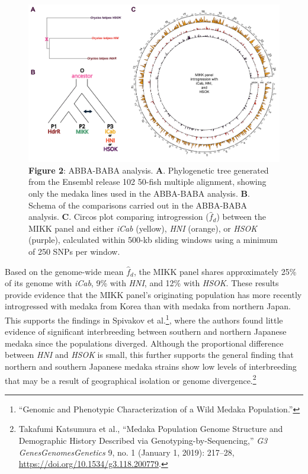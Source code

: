\documentclass[
]{book}
\begin{document}
\begin{figure}
\includegraphics[width=1\linewidth]{figs/mikk_genome/07_introgression} \caption{\textbf{Figure 2}: ABBA-BABA analysis. \textbf{A}. Phylogenetic tree generated from the Ensembl release 102 50-fish multiple alignment, showing only the medaka lines used in the ABBA-BABA analysis. \textbf{B}. Schema of the comparisons carried out in the ABBA-BABA analysis. \textbf{C}. Circos plot comparing introgression (\(\hat{f}_d\)) between the MIKK panel and either \emph{iCab} (yellow), \emph{HNI} (orange), or \emph{HSOK} (purple), calculated within 500-kb sliding windows using a minimum of 250 SNPs per window.}\label{fig:ABBABABA}
\end{figure}

Based on the genome-wide mean \(\hat{f}_d\), the MIKK panel shares approximately 25\% of its genome with \emph{iCab}, 9\% with \emph{HNI}, and 12\% with \emph{HSOK}. These results provide evidence that the MIKK panel's originating population has more recently introgressed with medaka from Korea than with medaka from northern Japan. This supports the findings in Spivakov et al.\footnote{{``Genomic and {Phenotypic Characterization} of a {Wild Medaka Population}.''}}, where the authors found little evidence of significant interbreeding between southern and northern Japanese medaka since the populations diverged. Although the proportional difference between \emph{HNI} and \emph{HSOK} is small, this further supports the general finding that northern and southern Japanese medaka strains show low levels of interbreeding that may be a result of geographical isolation or genome divergence.\footnote{Takafumi Katsumura et al., {``Medaka {Population Genome Structure} and {Demographic History Described} via {Genotyping-by-Sequencing},''} \emph{G3 Genes\textbar Genomes\textbar Genetics} 9, no. 1 (January 1, 2019): 217--28, \url{https://doi.org/10.1534/g3.118.200779}.}
\end{document}

